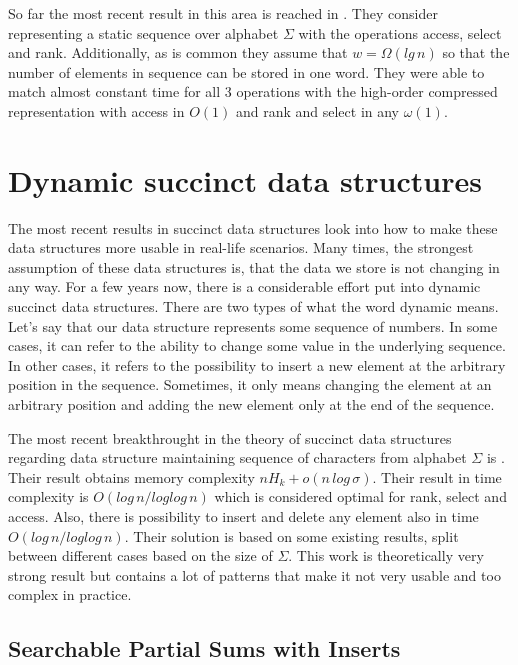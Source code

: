 So far the most recent result in this area is reached in \cite{belazzougui2015optimal}. They consider representing a static sequence over alphabet $\Sigma$ with the operations access, select and rank. Additionally, as is common they assume that $w=\Omega(lg\,n)$ so that the number of elements in sequence can be stored in one word. They were able to match almost constant time for all 3 operations with the high-order compressed representation with access in $O(1)$ and rank and select in any $\omega(1)$. 

\section{Dynamic succinct data structures}

The most recent results in succinct data structures look into how to make these data structures more usable in real-life scenarios. Many times, the
strongest assumption of these data structures is, that the data we store is not changing in any way. For a few years now, there is a considerable effort put into dynamic succinct data structures. There are two types of what the word dynamic means. Let's say that our data structure represents some sequence of numbers. In some cases, it can refer to the ability to change some value in the underlying sequence. In other cases, it refers to the possibility to insert a new element at the arbitrary position in the sequence. Sometimes, it only means changing the element at an arbitrary position and adding the new element only at the end of the sequence.

The most recent breakthrought in the theory of succinct data structures regarding data structure maintaining sequence of characters from alphabet $\Sigma$ is \cite{munro2015compressed}. Their result obtains memory complexity $nH_k+o(n\,log\,\sigma)$. Their result in time complexity is $O(log\,n/log log\,n)$ which is considered optimal for rank, select and access. Also, there is possibility to insert and delete any element also in time $O(log\,n/log log\,n)$. Their solution is based on some existing results, split between different cases based on the size of $\Sigma$. This work is theoretically very strong result but contains a lot of patterns that make it not very usable and too complex in practice.

\subsection{Searchable Partial Sums with Inserts}

